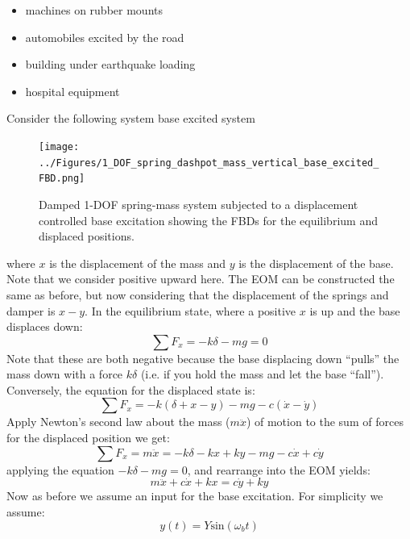\documentclass[12pt,letter]{article}
\numberwithin{ex}{section} %
\numberwithin{re}{section} %
\begin{document}
			\begin{itemize}
			\item machines on rubber mounts
			\item automobiles excited by the road
			\item building under earthquake loading
			\item hospital equipment
			\end{itemize}
			
			Consider the following system base excited system
			\begin{figure}[H]
				\centering
				\texttt{[image: ../Figures/1\_DOF\_spring\_dashpot\_mass\_vertical\_base\_excited\_FBD.png]}
				\caption{Damped 1-DOF spring-mass system subjected to a displacement controlled base excitation showing the FBDs for the equilibrium and displaced positions.}
				\label{fig:1_DOF_spring_dashpot_mass_vertical_base_excited_FBD}
			\end{figure}
			where $x$ is the displacement of the mass and $y$ is the displacement of the base. Note that we consider positive upward here. The EOM can be constructed the same as before, but now considering that the displacement of the springs and damper is $x-y$.  In the equilibrium state, where a positive $x$ is up and the base displaces down:
			\begin{equation}
			\sum F_x = -k\delta -mg =0
			\end{equation}	
			Note that these are both negative because the base displacing down ``pulls'' the mass down with a force $k\delta$ (i.e. if you hold the mass and let the base ``fall''). Conversely, the equation for the displaced state is:
			\begin{equation}
			\sum F_x = -k(\delta + x - y) -mg -c(\dot{x} -\dot{y})
			\end{equation}	
			Apply Newton's second law about the mass ($m\ddot{x}$) of motion to the sum of forces for the displaced position we get:
			\begin{equation}
			\sum F_x = m\ddot{x} = -k\delta -kx + ky -mg -c\dot{x} +c\dot{y}
			\end{equation}	
			applying the equation $-k\delta -mg =0$, and rearrange into the EOM yields:	
			\begin{equation}
			m\ddot{x} + c\dot{x} + kx = c\dot{y} + ky 
			\end{equation}
			Now as before we assume an input for the base excitation. For simplicity we assume:
			\begin{equation}
			y(t) = Y\text{sin}(\omega_b t)
			\end{equation}
\end{document}
